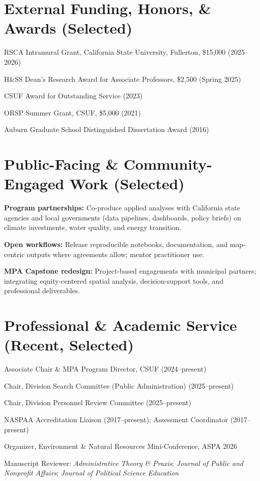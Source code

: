 \documentclass[12pt,letterpaper]{article}
\renewenvironment{itemize}{
  \begin{list}{}{
    \setlength{\leftmargin}{1.2em}
    \setlength{\itemsep}{0.15em}
    \setlength{\parskip}{0pt}
    \setlength{\parsep}{0.15em}
  }
}{
  \end{list}
}
\begin{document}
\section*{External Funding, Honors, \& Awards (Selected)}
\begin{itemize}
  \item RSCA Intramural Grant, California State University, Fullerton, \$15,000 (2025--2026)
  \item H\&SS Dean's Research Award for Associate Professors, \$2,500 (Spring 2025)
  \item CSUF Award for Outstanding Service (2023)
  \item ORSP Summer Grant, CSUF, \$5,000 (2021)
  \item Auburn Graduate School Distinguished Dissertation Award (2016)
\end{itemize}

\section*{Public-Facing \& Community-Engaged Work (Selected)}
\begin{itemize}
  \item \textbf{Program partnerships:} Co-produce applied analyses with California state agencies and local governments (data pipelines, dashboards, policy briefs) on climate investments, water quality, and energy transition.
  \item \textbf{Open workflows:} Release reproducible notebooks, documentation, and map-centric outputs where agreements allow; mentor practitioner use.
  \item \textbf{MPA Capstone redesign:} Project-based engagements with municipal partners; integrating equity-centered spatial analysis, decision-support tools, and professional deliverables.
\end{itemize}

\section*{Professional \& Academic Service (Recent, Selected)}
\begin{itemize}
  \item Associate Chair \& MPA Program Director, CSUF (2024--present)
  \item Chair, Division Search Committee (Public Administration) (2025--present)
  \item Chair, Division Personnel Review Committee (2025--present)
  \item NASPAA Accreditation Liaison (2017--present); Assessment Coordinator (2017--present)
  \item Organizer, Environment \& Natural Resources Mini-Conference, ASPA 2026
  \item Manuscript Reviewer: \emph{Administrative Theory \& Praxis}; \emph{Journal of Public and Nonprofit Affairs}; \emph{Journal of Political Science Education}
\end{itemize}
\end{document}
